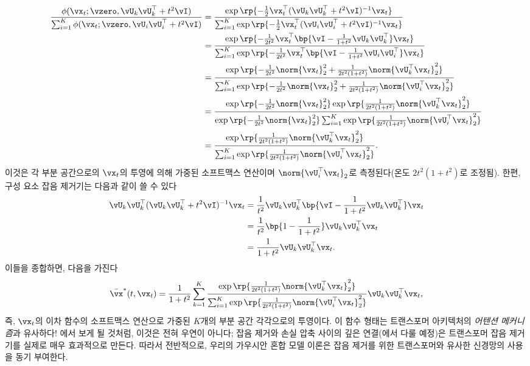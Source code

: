 \documentclass[../../book-main_ko.tex]{subfiles}
\begin{document}
\begin{align}
	\frac{\phi(\vx_{t} ; \vzero, \vU_{k}\vU_{k}^{\top} + t^{2}\vI)}{\sum_{i
	= 1}^{K}\phi(\vx_{t} ; \vzero, \vU_{i}\vU_{i}^{\top} + t^{2}\vI)}
	&= \frac{\exp\rp{-\frac{1}{2}\vx_{t}^{\top}(\vU_{k}\vU_{k}^{\top} + t^{2}\vI)^{-1}\vx_{t}}}{\sum_{i = 1}^{K}\exp\rp{-\frac{1}{2}\vx_{t}^{\top}(\vU_{i}\vU_{i}^{\top} + t^{2}\vI)^{-1}\vx_{t}}} \\
	&= \frac{\exp\rp{-\frac{1}{2t^{2}}\vx_{t}^{\top}\bp{\vI - \frac{1}{1 + t^{2}}\vU_{k}\vU_{k}^{\top}}\vx_{t}}}{\sum_{i = 1}^{K}\exp\rp{-\frac{1}{2t^{2}}\vx_{t}^{\top}\bp{\vI - \frac{1}{1 + t^{2}}\vU_{i}\vU_{i}^{\top}}\vx_{t}}} \\
	&= \frac{\exp\rp{-\frac{1}{2t^{2}}\norm{\vx_{t}}_{2}^{2} + \frac{1}{2t^{2}(1 + t^{2})}\norm{\vU_{k}^{\top}\vx_{t}}_{2}^{2}}}{\sum_{i = 1}^{K}\exp\rp{-\frac{1}{2t^{2}}\norm{\vx_{t}}_{2}^{2} + \frac{1}{2t^{2}(1 + t^{2})}\norm{\vU_{i}^{\top}\vx_{t}}_{2}^{2}}} \\
	&= \frac{\exp\rp{-\frac{1}{2t^{2}}\norm{\vx_{t}}_{2}^{2}}\exp\rp{\frac{1}{2t^{2}(1 + t^{2})}\norm{\vU_{k}^{\top}\vx_{t}}_{2}^{2}}}{\exp\rp{-\frac{1}{2t^{2}}\norm{\vx_{t}}_{2}^{2}}\sum_{i = 1}^{K}\exp\rp{\frac{1}{2t^{2}(1 + t^{2})}\norm{\vU_{i}^{\top}\vx_{t}}_{2}^{2}}} \\
	&= \frac{\exp\rp{\frac{1}{2t^{2}(1 + t^{2})}\norm{\vU_{k}^{\top}\vx_{t}}_{2}^{2}}}{\sum_{i = 1}^{K}\exp\rp{\frac{1}{2t^{2}(1 + t^{2})}\norm{\vU_{i}^{\top}\vx_{t}}_{2}^{2}}}.
\end{align}
이것은 각 부분 공간으로의 \(\vx_{t}\)의 투영에 의해 가중된 소프트맥스 연산이며 \(\norm{\vU_{i}^{\top}\vx_{t}}_{2}\)로 측정된다(온도 \(2t^{2}(1 + t^{2})\)로 조정됨). 한편, 구성 요소 잡음 제거기는 다음과 같이 쓸 수 있다
\begin{align}
	\vU_{k}\vU_{k}^{\top}(\vU_{k}\vU_{k}^{\top} + t^{2}\vI)^{-1}\vx_{t}
	&= \frac{1}{t^{2}}\vU_{k}\vU_{k}^{\top}\bp{\vI - \frac{1}{1 + t^{2}}\vU_{k}\vU_{k}^{\top}}\vx_{t} \\
	&= \frac{1}{t^{2}}\bp{1 - \frac{1}{1 + t^{2}}}\vU_{k}\vU_{k}^{\top}\vx_{t} \\
	&= \frac{1}{1 + t^{2}}\vU_{k}\vU_{k}^{\top}\vx_{t}.
\end{align}
이들을 종합하면, 다음을 가진다
\begin{equation}\label{eq:gmm_lowrank_denoiser}
	\bar{\vx}^{\ast}(t, \vx_{t}) = \frac{1}{1 + t^{2}}\sum_{k = 1}^{K}\frac{\exp\rp{\frac{1}{2t^{2}(1 + t^{2})}\norm{\vU_{k}^{\top}\vx_{t}}_{2}^{2}}}{\sum_{i = 1}^{K}\exp\rp{\frac{1}{2t^{2}(1 + t^{2})}\norm{\vU_{i}^{\top}\vx_{t}}_{2}^{2}}}\vU_{k}\vU_{k}^{\top}\vx_{t},
\end{equation}
즉, \(\vx_{t}\)의 이차 함수의 소프트맥스 연산으로 가중된 \(K\)개의 부분 공간 각각으로의 투영이다. 이 함수 형태는 트랜스포머 아키텍처의 \textit{어텐션 메커니즘}과 유사하다! 에서 보게 될 것처럼, 이것은 전혀 우연이 아니다; 잡음 제거와 손실 압축 사이의 깊은 연결(에서 다룰 예정)은 트랜스포머 잡음 제거기를 실제로 매우 효과적으로 만든다. 따라서 전반적으로, 우리의 가우시안 혼합 모델 이론은 잡음 제거를 위한 트랜스포머와 유사한 신경망의 사용을 동기 부여한다.
\end{document}
